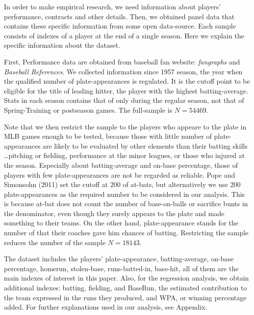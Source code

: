 \documentclass[dvipdfmx, 12pt]{article}
\begin{document}
In order to make empirical research, we need information about players' performance, contracts and other details. Then, we obtained panel data that contains these specific information from some open data-source. Each sample consists of indexes of a player at the end of a single season. Here we explain the specific information about the dataset.

First, Performance data are obtained from baseball fan website:  \textit{fangraphs} and \textit{Baseball References}. We collected information since 1957 season, the year when the qualified number of plate-appearances is regulated. It is the cutoff point to be eligible for the title of leading hitter, the player with the highest batting-average. Stats in each season contains that of only during the regular season, not that of Spring-Training or postseason games. The full-sample is $N=54469$.

Note that we then restrict the sample to the players who appeare to the plate in MLB games enough to be tested, because those with little number of plate-appearances are likely to be evaluated by other elements than their batting skills \ldots pitching or fielding, performance at the minor leagues, or those who injured at the season. Especially about batting-average and on-base percentage, those of players with few plate-appearances are not be regarded as reliable. Pope and Simonsohn (2011) set the cutoff at 200 of at-bats, but alternatively we use 200 plate-appearances as the required number to be considered in our analysis. This is because at-bat does not count the number of base-on-balls or sacrifice bunts in the denominator, even though they surely appears to the plate and made something to their teams. On the other hand, plate-appearance stands for the number of that their coaches gave him chances of batting. Restricting the sample reduces the number of the sample $N=18143$.

The dataset includes the players' plate-appearance, batting-average, on-base percentage, homerun, stolen-base, runs-batted-in, base-hit, all of them are the main indexes of interest in this paper. Also, for the regression analysis, we obtain additional indexes: batting, fielding, and BaseRun, the estimated contribution to the team expressed in the runs they produced, and WPA, or winning percentage added. For further explanations used in our analysis, see Appendix.
\end{document}
